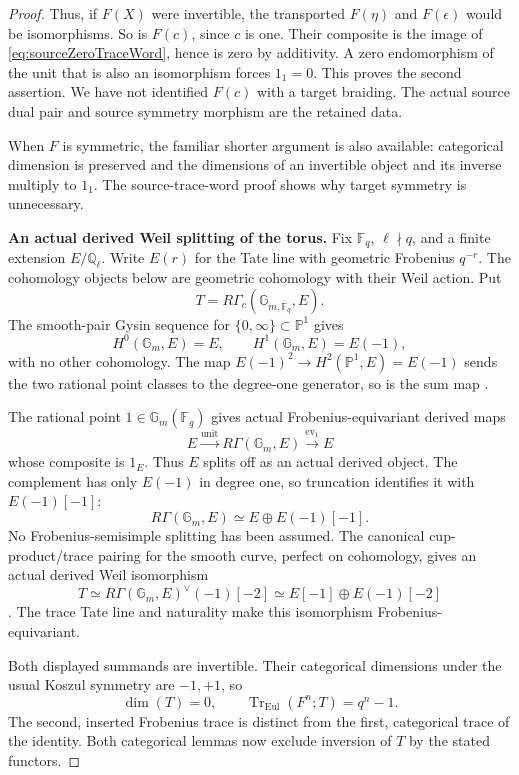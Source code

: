 \documentclass[11pt,a4paper]{article}
\theoremstyle{named}\newtheorem{finding}{Finding}[section]
\theoremstyle{definition}\newtheorem{definition}[finding]{Definition}
\theoremstyle{remark}\newtheorem{remark}[finding]{Remark}
\begin{document}
\begin{proof}
Thus, if \(F(X)\) were invertible, the transported
\(F(\eta)\) and \(F(\epsilon)\) would be
isomorphisms. So is \(F(c)\), since \(c\) is one.
Their composite is the image of
\eqref{eq:sourceZeroTraceWord}, hence is zero
by additivity. A zero endomorphism of the unit
that is also an isomorphism forces \(1_1=0\).
This proves the second assertion.
We have not identified \(F(c)\) with a target
braiding. The actual source dual pair and source
symmetry morphism are the retained data.

When \(F\) is symmetric, the familiar shorter
argument is also available: categorical dimension
is preserved and the dimensions of an invertible
object and its inverse multiply to \(1_1\).
The source-trace-word proof shows why target
symmetry is unnecessary.

\par\smallskip\noindent\textbf{An actual derived Weil splitting of the torus.}\quad
Fix \(\mathbb F_q\), \(\ell\nmid q\), and a
finite extension \(E/\mathbb Q_\ell\).
Write \(E(r)\) for the Tate line with geometric
Frobenius \(q^{-r}\). The cohomology objects below
are geometric cohomology with their Weil action.
Put
\[
 T=R\Gamma_c(\mathbb G_{m,\overline{\mathbb F}_q},E).
\]
The smooth-pair Gysin sequence for
\(\{0,\infty\}\subset\mathbb P^1\) gives
\[
 H^0(\mathbb G_m,E)=E,\qquad
 H^1(\mathbb G_m,E)=E(-1),
\]
with no other cohomology. The map
\(E(-1)^2\to H^2(\mathbb P^1,E)=E(-1)\)
sends the two rational point classes to the
degree-one generator, so is the sum map
\cite[Theorem~16.1 and Corollary~16.2, p.~108;
Theorem~23.2, pp.~139--140;
Remark~24.2(b), p.~145]{Milne}.

The rational point \(1\in\mathbb G_m(\mathbb F_q)\)
gives actual Frobenius-equivariant derived maps
\[
 E\xrightarrow{\mathrm{unit}}R\Gamma(\mathbb G_m,E)
     \xrightarrow{\mathrm{ev}_1}E
\]
whose composite is \(1_E\).
Thus \(E\) splits off as an actual derived object.
The complement has only \(E(-1)\) in degree one,
so truncation identifies it with \(E(-1)[-1]\):
\[
 R\Gamma(\mathbb G_m,E)\simeq E\oplus E(-1)[-1].
\]
No Frobenius-semisimple splitting has been assumed.
The canonical cup-product/trace pairing for the
smooth curve, perfect on cohomology, gives an
actual derived Weil isomorphism
\[
 T\simeq R\Gamma(\mathbb G_m,E)^\vee(-1)[-2]
 \simeq E[-1]\oplus E(-1)[-2]
\]
\cite[Theorem~24.1(a),(b), p.~144]{Milne}.
The trace Tate line and naturality make this
isomorphism Frobenius-equivariant.

Both displayed summands are invertible.
Their categorical dimensions under the usual
Koszul symmetry are \(-1,+1\), so
\[
 \dim(T)=0,\qquad
 \operatorname{Tr}_{\mathrm{Eul}}(F^n;T)=q^n-1.
\]
The second, inserted Frobenius trace is distinct
from the first, categorical trace of the identity.
Both categorical lemmas now exclude inversion
of \(T\) by the stated functors.


\end{proof}
\end{document}
